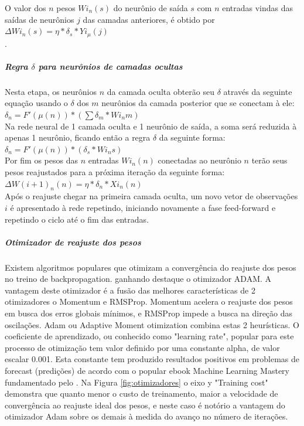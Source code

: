     O valor dos $n$ pesos $Wi_{n}(s)$ do neurônio de saída $s$ com $n$ entradas vindas das saídas de neurônios $j$ das camadas anteriores, é obtido por $\Delta Wi_{n}(s) = \eta*\delta_s*Yi_{\mu}(j)$\\.
    
    \subparagraph*{Regra $\delta$ para neurônios de camadas ocultas}
    Nesta etapa, os neurônios $n$ da camada oculta obterão seu $\delta$ através da seguinte equação usando o $\delta$ dos $m$ neurônios da camada posterior que se conectam à ele:\\ 
    
    $\delta_n = F'(\mu(n))*(\sum \delta_m*Wi_{n}m)$\\
    
    Na rede neural de 1 camada oculta e 1 neurônio de saída, a soma será reduzida à apenas 1 neurônio, ficando então a regra $\delta$ da seguinte forma:\\
    
    $\delta_n = F'(\mu(n))*(\delta_s*Wi_{n}s)$\\
    
    Por fim os pesos das $n$ entradas $Wi_{n}(n)$ conectadas ao neurônio $n$ terão seus pesos reajustados para a próxima iteração da seguinte forma:\\
    $\Delta W(i+1)_{n}(n) = \eta*\delta_n*Xi_{n}(n)$\\
    
    Após o reajuste chegar na primeira camada oculta, um novo vetor de observações $i$ é apresentado à rede repetindo, iniciando novamente a fase feed-forward e repetindo o ciclo até o fim das entradas.
    
    \subparagraph{Otimizador de reajuste dos pesos}
    
    Existem algoritmos populares que otimizam a convergência do reajuste dos pesos no treino de backpropagation. ganhando destaque o otimizador ADAM. A vantagem deste otimizador é a fusão das melhores características de 2 otimizadores o Momentum e RMSProp. Momentum acelera o reajuste dos pesos em busca dos erros globais mínimos, e RMSProp impede a busca na direção das oscilações.\newline
    Adam ou Adaptive Moment otimization combina estas 2 heurísticas. O coeficiente de aprendizado, ou conhecido como "learning rate", popular para este processo de otimização tem valor definido por uma constante alpha, de valor escalar 0.001.
    Esta constante tem produzido resultados positivos em problemas de forecast (predições) de acordo com o popular ebook Machine Learning Mastery fundamentado pelo . Na Figura \ref{fig:otimizadores} o eixo y "Training cost" demonstra que quanto menor o custo de treinamento, maior a velocidade de convergência ao reajuste ideal dos pesos, e neste caso é notório a vantagem do otimizador Adam sobre os demais à medida do avanço no número de iterações.
    
